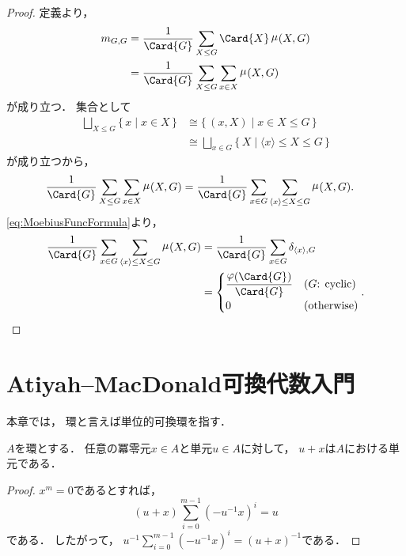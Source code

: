 \documentclass{jlreq}
\newcommand{\MoebiusFunc}[1][\relax]{\mathop{\mu}\nolimits_{#1}}
\DeclareMathOperator{\EulerTotientFunc}{\varphi}
\begin{document}
	\begin{proof}
		定義より，
		\begin{align}
			m_{G, G}
			&= \frac{1}{\Card{G}} \sum_{X \le G} \Card{X} \MoebiusFunc(X, G) \\
			&= \frac{1}{\Card{G}} \sum_{X \le G} \sum_{x \in X} \MoebiusFunc(X, G)
		\end{align}
		が成り立つ．
		集合として
		\begin{align}
			\bigsqcup_{X \le G} \{\, x \mid x \in X \,\} 
			&\cong \{\, (x, X) \mid x \in X \le G \,\} \\
			&\cong \bigsqcup_{x \in G} \{\, X  \mid \langle x \rangle \le X \le G \,\}
		\end{align}
		が成り立つから，
		\begin{align}
			\frac{1}{\Card{G}} \sum_{X \le G} \sum_{x \in X} \MoebiusFunc(X, G)
			&= \frac{1}{\Card{G}} \sum_{x \in G} \sum_{\langle x \rangle \le X \le G} \MoebiusFunc(X,G).
		\end{align}
		\cref{eq:MoebiusFuncFormula}より，
		\begin{align}
			\frac{1}{\Card{G}} \sum_{x \in G} \sum_{\langle x \rangle \le X \le G} \MoebiusFunc(X,G)
			&= \frac{1}{\Card{G}} \sum_{x \in G} \delta_{\langle x \rangle, G} \\
			&= \begin{cases}
				\dfrac{\EulerTotientFunc(\Card{G})}{\Card{G}} & (\text{$G$: cyclic}) \\
				0 & (\text{otherwise})
			\end{cases}. \qedhere
		\end{align}
	\end{proof}
	
	\section{\texorpdfstring{Atiyah--MacDonald可換代数入門~\cite{atiyah2006}}{Atiyah-MacDonald可換代数入門}}
	
	本章では，
	環と言えば単位的可換環を指す．
	
	\begin{proposition}[p.\,16; 演習問題1]\label{AM:ex.1.1}
		$A$を環とする．
		任意の冪零元$x \in A$と単元$u \in A$に対して，
		$u + x$は$A$における単元である．
	\end{proposition}
	
	\begin{proof}
		$x^m = 0$であるとすれば，
		\begin{equation}
			(u+x)\sum_{i=0}^{m-1}(-u^{-1}x)^i = u
		\end{equation}
		である．
		したがって，
		$u^{-1}\sum_{i=0}^{m-1}(-u^{-1}x)^i = (u+x)^{-1}$である．
	\end{proof}
	
\end{document}
